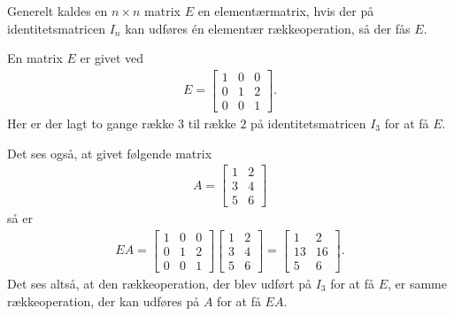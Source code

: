 
Generelt kaldes en $n \times n$ matrix $E$ en elementærmatrix, hvis der på identitetsmatricen $I_n$ kan udføres én elementær rækkeoperation, så der fås $E$. 

\begin{eks}
En matrix $E$ er givet ved
\begin{align*}
E =\begin{bmatrix}
1 & 0 & 0 \\
0 & 1 & 2 \\
0 & 0 & 1 
\end{bmatrix}.
\end{align*}
Her er der lagt to gange række $3$ til række $2$ på identitetsmatricen $I_3$ for at få $E$.

Det ses også, at givet følgende matrix
\begin{align*}
A =\begin{bmatrix}
1 & 2 \\
3 & 4 \\
5 & 6 
\end{bmatrix}
\end{align*}
så er
\begin{align*}
EA =\begin{bmatrix}
1 & 0 & 0 \\
0 & 1 & 2 \\
0 & 0 & 1
\end{bmatrix}
\begin{bmatrix}
1 & 2 \\
3 & 4 \\
5 & 6
\end{bmatrix}
=\begin{bmatrix}
1 & 2 \\
13 & 16 \\
5 & 6
\end{bmatrix}.
\end{align*}
Det ses altså, at den rækkeoperation, der blev udført på $I_3$ for at få $E$, er samme rækkeoperation, der kan udføres på $A$ for at få $EA$. 
\end{eks}
 

